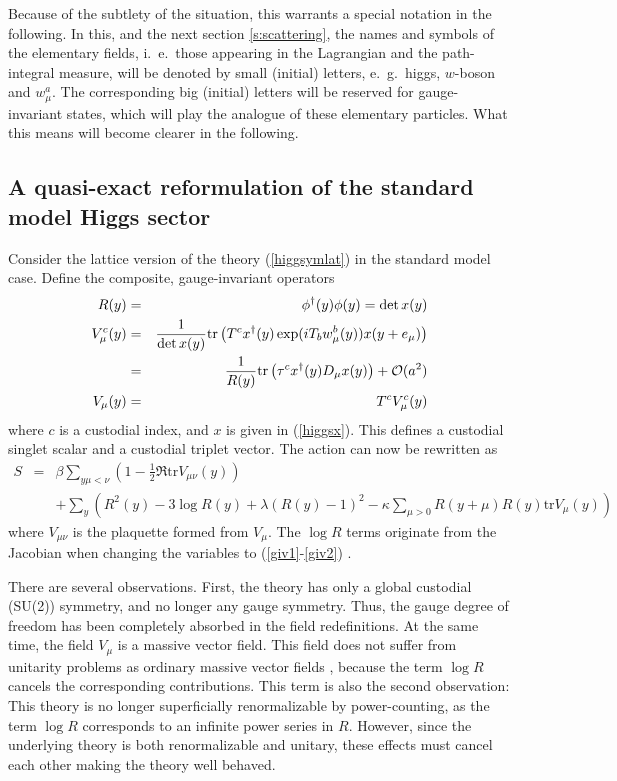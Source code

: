 \documentclass[final,12pt,3p,longtitle]{elsarticle}
\newcommand*{\no}{\noindent}
\newcommand*{\bea}{\begin{eqnarray}}
\newcommand*{\eea}{\end{eqnarray}}
\newcommand*{\pref}[1]{(\ref{#1})}
\newcommand*{\mn}{{\mu\nu}}
\newcommand*{\prefr}[2]{(\ref{#1}-\ref{#2})}
\newcommand*{\nn}{\nonumber}
\newcommand*{\tr}{\mathrm{tr}}
\newcommand*{\1}{1\!\!\!\bot}
\begin{document}
Because of the subtlety of the situation, this warrants a special notation in the following. In this, and the next section \ref{s:scattering}, the names and symbols of the elementary fields, i.\ e.\ those appearing in the Lagrangian and the path-integral measure, will be denoted by small (initial) letters, e.\ g.\ higgs, $w$-boson and $w_\mu^a$. The corresponding big (initial) letters will be reserved for gauge-invariant states, which will play the analogue of these elementary particles. What this means will become clearer in the following.

\subsection{A quasi-exact reformulation of the standard model Higgs sector}\label{ss:reformsm}

Consider the lattice version of the theory \pref{higgsymlat} in the standard model case. Define the composite, gauge-invariant operators
\bea
R(y)&=&\phi^\dagger(y)\phi(y)=\det x(y)\label{giv1}\\
V_\mu^c(y)&=&\frac{1}{\det x(y)}\tr\left(T^c x^\dagger(y) \exp(iT_bw^b_\mu(y))x(y+e_\mu)\right)\nn\\
&=&\frac{1}{R(y)}\tr\left(\tau^c x^\dagger(y) D_\mu x(y)\right)+{\cal O}(a^2)\label{giv2}\\
V_\mu(y)&=&T^cV_\mu^c(y)\nn
\eea
\no where $c$ is a custodial index, and $x$ is given in \pref{higgsx}. This defines a custodial singlet scalar and a custodial triplet vector. The action can now be rewritten as \cite{Frohlich:1980gj,Frohlich:1981yi,Langguth:1985eu,Philipsen:1996af}
\bea
S&=&\beta\sum_{y\mu<\nu}\left(1-\frac{1}{2}\Re\tr V_{\mn}(y)\right)\nn\\
&&+\sum_y\left(R^2(y)-3\log R(y)+\lambda(R(y)-1)^2-\kappa\sum_{\mu>0}R(y+\mu)R(y)\tr V_\mu(y)\right)\nn
\eea
\no where $V_\mn$ is the plaquette formed from $V_\mu$. The $\log R$ terms originate from the Jacobian when changing the variables to \prefr{giv1}{giv2} \cite{Langguth:1985eu}.

There are several observations. First, the theory has only a global custodial (SU(2)) symmetry, and no longer any gauge symmetry. Thus, the gauge degree of freedom has been completely absorbed in the field redefinitions. At the same time, the field $V_\mu$ is a massive vector field. This field does not suffer from unitarity problems as ordinary massive vector fields \cite{Bohm:2001yx}, because the term $\log R$ cancels the corresponding contributions. This term is also the second observation: This theory is no longer superficially renormalizable by power-counting, as the term $\log R$ corresponds to an infinite power series in $R$. However, since the underlying theory is both renormalizable and unitary, these effects must cancel each other making the theory well behaved.
\end{document}
